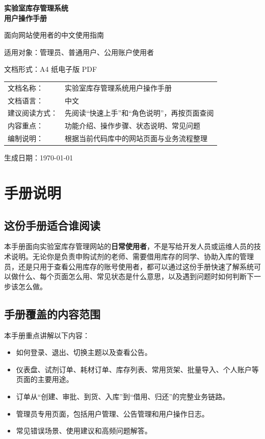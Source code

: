 \documentclass[12pt,a4paper]{ctexart}
\begin{document}
\begin{titlepage}
  \centering
  \vspace*{2.5cm}
  {\Huge\bfseries 实验室库存管理系统\\[0.6cm]用户操作手册\par}
  \vspace{1.5cm}
  {\Large 面向网站使用者的中文使用指南\par}
  \vspace{1.2cm}
  {\large 适用对象：管理员、普通用户、公用账户使用者\par}
  \vspace{0.8cm}
  {\large 文档形式：A4 纸电子版 PDF\par}
  \vfill
  \begin{tabular}{>{\raggedright\arraybackslash}p{4cm} p{8cm}}
    文档名称： & 实验室库存管理系统用户操作手册 \\
    文档语言： & 中文 \\
    建议阅读方式： & 先阅读“快速上手”和“角色说明”，再按页面查阅 \\
    内容重点： & 功能介绍、操作步骤、状态说明、常见问题 \\
    编制说明： & 根据当前代码库中的网站页面与业务流程整理 \\
  \end{tabular}
  \vfill
  {\large 生成日期：\today\par}
\end{titlepage}

\tableofcontents
\newpage

\section{手册说明}

\subsection{这份手册适合谁阅读}
本手册面向实验室库存管理网站的\textbf{日常使用者}，不是写给开发人员或运维人员的技术说明。无论你是负责申购试剂的老师、需要借用库存的同学、协助入库的管理员，还是只用于查看公用库存的账号使用者，都可以通过这份手册快速了解系统可以做什么、每个页面怎么用、常见状态是什么意思，以及遇到问题时如何判断下一步该怎么做。

\subsection{手册覆盖的内容范围}
本手册重点讲解以下内容：
\begin{itemize}
  \item 如何登录、退出、切换主题以及查看公告。
  \item 仪表盘、试剂订单、耗材订单、库存列表、常用货架、批量导入、个人账户等页面的主要用途。
  \item 订单从“创建、审批、到货、入库”到“借用、归还”的完整业务链路。
  \item 管理员专用页面，包括用户管理、公告管理和用户操作日志。
  \item 常见错误场景、使用建议和高频问题解答。
\end{itemize}
\end{document}
